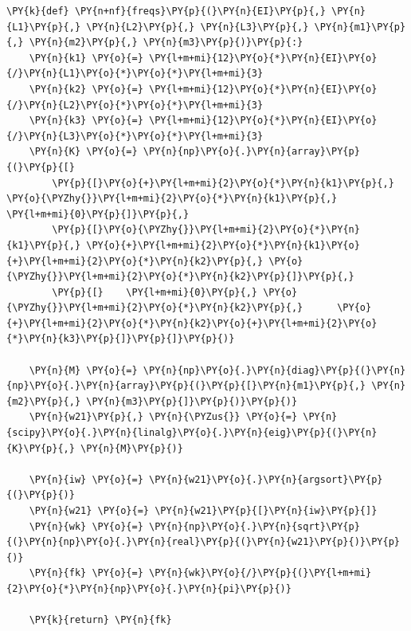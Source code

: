     \begin{tcolorbox}[breakable, size=fbox, boxrule=1pt, pad at break*=1mm,colback=cellbackground, colframe=cellborder]
\begin{Verbatim}[commandchars=\\\{\}]
\PY{k}{def} \PY{n+nf}{freqs}\PY{p}{(}\PY{n}{EI}\PY{p}{,} \PY{n}{L1}\PY{p}{,} \PY{n}{L2}\PY{p}{,} \PY{n}{L3}\PY{p}{,} \PY{n}{m1}\PY{p}{,} \PY{n}{m2}\PY{p}{,} \PY{n}{m3}\PY{p}{)}\PY{p}{:}
    \PY{n}{k1} \PY{o}{=} \PY{l+m+mi}{12}\PY{o}{*}\PY{n}{EI}\PY{o}{/}\PY{n}{L1}\PY{o}{*}\PY{o}{*}\PY{l+m+mi}{3}
    \PY{n}{k2} \PY{o}{=} \PY{l+m+mi}{12}\PY{o}{*}\PY{n}{EI}\PY{o}{/}\PY{n}{L2}\PY{o}{*}\PY{o}{*}\PY{l+m+mi}{3}
    \PY{n}{k3} \PY{o}{=} \PY{l+m+mi}{12}\PY{o}{*}\PY{n}{EI}\PY{o}{/}\PY{n}{L3}\PY{o}{*}\PY{o}{*}\PY{l+m+mi}{3}
    \PY{n}{K} \PY{o}{=} \PY{n}{np}\PY{o}{.}\PY{n}{array}\PY{p}{(}\PY{p}{[}
        \PY{p}{[}\PY{o}{+}\PY{l+m+mi}{2}\PY{o}{*}\PY{n}{k1}\PY{p}{,} \PY{o}{\PYZhy{}}\PY{l+m+mi}{2}\PY{o}{*}\PY{n}{k1}\PY{p}{,}       \PY{l+m+mi}{0}\PY{p}{]}\PY{p}{,}
        \PY{p}{[}\PY{o}{\PYZhy{}}\PY{l+m+mi}{2}\PY{o}{*}\PY{n}{k1}\PY{p}{,} \PY{o}{+}\PY{l+m+mi}{2}\PY{o}{*}\PY{n}{k1}\PY{o}{+}\PY{l+m+mi}{2}\PY{o}{*}\PY{n}{k2}\PY{p}{,} \PY{o}{\PYZhy{}}\PY{l+m+mi}{2}\PY{o}{*}\PY{n}{k2}\PY{p}{]}\PY{p}{,}
        \PY{p}{[}    \PY{l+m+mi}{0}\PY{p}{,} \PY{o}{\PYZhy{}}\PY{l+m+mi}{2}\PY{o}{*}\PY{n}{k2}\PY{p}{,}      \PY{o}{+}\PY{l+m+mi}{2}\PY{o}{*}\PY{n}{k2}\PY{o}{+}\PY{l+m+mi}{2}\PY{o}{*}\PY{n}{k3}\PY{p}{]}\PY{p}{]}\PY{p}{)}

    \PY{n}{M} \PY{o}{=} \PY{n}{np}\PY{o}{.}\PY{n}{diag}\PY{p}{(}\PY{n}{np}\PY{o}{.}\PY{n}{array}\PY{p}{(}\PY{p}{[}\PY{n}{m1}\PY{p}{,} \PY{n}{m2}\PY{p}{,} \PY{n}{m3}\PY{p}{]}\PY{p}{)}\PY{p}{)}
    \PY{n}{w21}\PY{p}{,} \PY{n}{\PYZus{}} \PY{o}{=} \PY{n}{scipy}\PY{o}{.}\PY{n}{linalg}\PY{o}{.}\PY{n}{eig}\PY{p}{(}\PY{n}{K}\PY{p}{,} \PY{n}{M}\PY{p}{)}

    \PY{n}{iw} \PY{o}{=} \PY{n}{w21}\PY{o}{.}\PY{n}{argsort}\PY{p}{(}\PY{p}{)}
    \PY{n}{w21} \PY{o}{=} \PY{n}{w21}\PY{p}{[}\PY{n}{iw}\PY{p}{]}
    \PY{n}{wk} \PY{o}{=} \PY{n}{np}\PY{o}{.}\PY{n}{sqrt}\PY{p}{(}\PY{n}{np}\PY{o}{.}\PY{n}{real}\PY{p}{(}\PY{n}{w21}\PY{p}{)}\PY{p}{)}
    \PY{n}{fk} \PY{o}{=} \PY{n}{wk}\PY{o}{/}\PY{p}{(}\PY{l+m+mi}{2}\PY{o}{*}\PY{n}{np}\PY{o}{.}\PY{n}{pi}\PY{p}{)}

    \PY{k}{return} \PY{n}{fk}
\end{Verbatim}
\end{tcolorbox}

